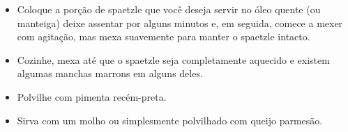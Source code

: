 \documentclass [11pt, letterpaper] {article}
\begin{document}
\begin {description}
\begin {description}
\begin {itemize}
\item Coloque a porção de spaetzle que você deseja servir no óleo quente (ou manteiga) deixe assentar por alguns minutos e, em seguida, comece a mexer com agitação, mas mexa suavemente para manter o spaetzle intacto.
\item Cozinhe, mexa até que o spaetzle seja completamente aquecido e existem algumas manchas marrons em alguns deles.
\item Polvilhe com pimenta recém-preta.
\item Sirva com um molho ou simplesmente polvilhado com queijo parmesão.
\end {itemize}
\end {description}
\end {description}
\end{document}
